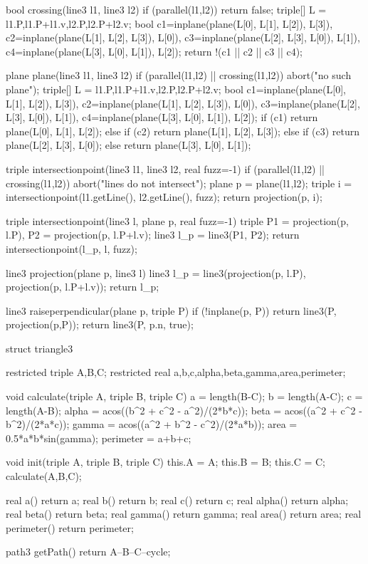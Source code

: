 bool crossing(line3 l1, line3 l2) {
  	if (parallel(l1,l2)) return false;
	triple[] L = {l1.P,l1.P+l1.v,l2.P,l2.P+l2.v};
  	bool c1=inplane(plane(L[0], L[1], L[2]), L[3]),
  		 c2=inplane(plane(L[1], L[2], L[3]), L[0]),
  		 c3=inplane(plane(L[2], L[3], L[0]), L[1]),
  		 c4=inplane(plane(L[3], L[0], L[1]), L[2]);
  	return !(c1 || c2 || c3 || c4);
}

plane plane(line3 l1, line3 l2) {
  	if (parallel(l1,l2) || crossing(l1,l2)) abort("no such plane");
	triple[] L = {l1.P,l1.P+l1.v,l2.P,l2.P+l2.v};
  	bool c1=inplane(plane(L[0], L[1], L[2]), L[3]),
  		 c2=inplane(plane(L[1], L[2], L[3]), L[0]),
  		 c3=inplane(plane(L[2], L[3], L[0]), L[1]),
  		 c4=inplane(plane(L[3], L[0], L[1]), L[2]);
    if (c1) return plane(L[0], L[1], L[2]);
  	else if (c2) return plane(L[1], L[2], L[3]);
  	else if (c3) return plane(L[2], L[3], L[0]);
  	else return plane(L[3], L[0], L[1]);
}

triple intersectionpoint(line3 l1, line3 l2, real fuzz=-1) {
	if (parallel(l1,l2) || crossing(l1,l2)) abort("lines do not intersect");
  	plane p = plane(l1,l2);
  	triple i = intersectionpoint(l1.getLine(), l2.getLine(), fuzz);
  	return projection(p, i);
}

triple intersectionpoint(line3 l, plane p, real fuzz=-1) {
	triple P1 = projection(p, l.P), P2 = projection(p, l.P+l.v);
  	line3 l_p = line3(P1, P2);
  	return intersectionpoint(l_p, l, fuzz);
}

line3 projection(plane p, line3 l) {
	line3 l_p = line3(projection(p, l.P), projection(p, l.P+l.v));
  	return l_p;
}

line3 raiseperpendicular(plane p, triple P) {
	if (!inplane(p, P)) return line3(P, projection(p,P));
  	return line3(P, p.n, true);
}

struct triangle3 {
	restricted triple A,B,C;
  	restricted real a,b,c,alpha,beta,gamma,area,perimeter;
  
  	void calculate(triple A, triple B, triple C) {
    	a = length(B-C);
      	b = length(A-C);
      	c = length(A-B);
      	alpha = acos((b^2 + c^2 - a^2)/(2*b*c));
      	beta = acos((a^2 + c^2 - b^2)/(2*a*c));
        gamma = acos((a^2 + b^2 - c^2)/(2*a*b));
      	area = 0.5*a*b*sin(gamma);
      	perimeter = a+b+c;
    }
  
  	void init(triple A, triple B, triple C) {
    	this.A = A;
      	this.B = B;
      	this.C = C;
      	calculate(A,B,C);
    }
  
  	real a() { return a; }
  	real b() { return b; }
  	real c() { return c; }
  	real alpha() { return alpha; }
  	real beta() { return beta; }
  	real gamma() { return gamma; }
  	real area() { return area; }
  	real perimeter() { return perimeter; }
  
  	path3 getPath() {
    	return A--B--C--cycle;
    }

}

